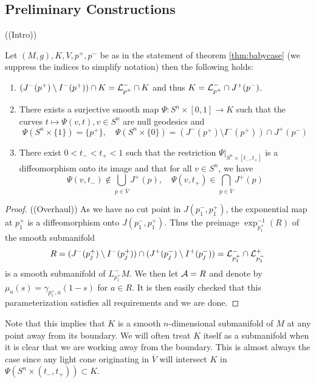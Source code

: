 \subsection{Preliminary Constructions}
((Intro))
\begin{lemma}\label{lem:Kcharact}
Let $(M,g), K, V, p^+,p^-$ be as in the statement of theorem \ref{thm:babycase} (we suppress the indices to simplify notation) then the following holds:
\begin{enumerate}[label={\textnormal{(\arabic*)}}]
\item $(J^-(p^+)\setminus I^-(p^+)) \cap K = \mathcal{L}^-_{p^+} \cap K$ and thus $K = \mathcal{L}^-_{p^+} \cap J^+(p^-)$.
\item There exists a surjective smooth map $\Psi:S^n\times[0,1]\to K$ such that the curves $t\mapsto\Psi(v,t), v\in S^n$ are null geodesics and \[\Psi(S^n\times\{1\}) = \{p^+\}, \quad \Psi(S^n\times\{0\}) = (J^-(p^+)\setminus I^-(p^+)) \cap J^+(p^-)\]
\item There exist $0<t_-<t_+<1$ such that the restriction $\Psi\rvert_{S^n\times[t_-,t_+]}$ is a diffeomorphism onto its image and that for all $v \in S^n$, we have 
\[
\Psi(v,t_-) \notin \bigcup_{p\in \overline{V}} J^+(p), \quad \Psi(v,t_+) \in \bigcap_{p\in \overline{V}} J^+(p)
\]
\end{enumerate}
\end{lemma}
\begin{proof}
((Overhaul))
As we have no cut point in $J(p_1^-,p_1^+)$, the exponential map at $p_1^+$ is a diffeomorphism onto $J(p_1^-,p_1^+)$. Thus the preimage $\exp^{-1}_{p_1^+}(R)$ of the smooth submanifold
\[
    R = (J^-(p_j^+)\setminus I^-(p_j^+)) \cap (J^+(p_j^-)\setminus I^+(p_j^-)) = \mathcal{L}^-_{p_1^+} \cap \mathcal{L}^+_{p_1^-}
\]
is a smooth submanifold of $L^-_{p^+_1}M$. We then let $\mathcal{A}=R$ and denote by $\mu_a(s) = \gamma_{p_1^+,a}(1-s)$ for $a\in R$. It is then easily checked that this parameterization satisfies all requirements and we are done.
\end{proof}

Note that this implies that $K$ is a smooth $n$-dimensional submanifold of $M$ at any point away from its boundary. We will often treat $K$ itself as a submanifold when it is clear that we are working away from the boundary. This is almost always the case since any light cone originating in $\overline{V}$ will intersect $K$ in $\Psi(S^n\times(t_-,t_+))\subset K$.

